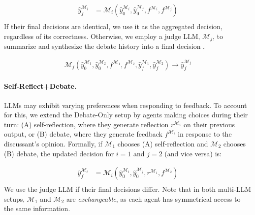 \begin{equation}
\begin{split}
    \hat{y}_f^{\mathcal{M}_i} &= \mathcal{M}_i(\hat{y}_0^{\mathcal{M}_i}, \hat{y}_0^{\mathcal{M}_j}, f^{\mathcal{M}_i}, f^{\mathcal{M}_j}) \\
\end{split}
\end{equation}
If their final decisions are identical, we use it as the aggregated decision, regardless of its correctness. Otherwise, we employ a judge LLM, $\mathcal{M}_j$, to summarize and synthesize the debate history into a final decision \cite{feng-etal-2024-dont, li-etal-2024-llms-speak}.



\begin{equation}
\begin{split}
    \mathcal{M}_j(\hat{y}_0^{\mathcal{M}_1}, \hat{y}_0^{\mathcal{M}_2}, f^{\mathcal{M}_1}, f^{\mathcal{M}_2},
    \hat{y}_f^{\mathcal{M}_1}, \hat{y}_f^{\mathcal{M}_2}) \rightarrow \hat{y}_f^{\mathcal{M}_j}
\end{split}
\end{equation}

\paragraph{Self-Reflect+Debate.}
LLMs may exhibit varying preferences when responding to feedback. To account for this, we extend the Debate-Only setup by agents making choices during their turn: (A) self-reflection, where they generate reflection $r^{\mathcal{M}_i}$ on their previous output, or (B) debate, where they generate feedback $f^{\mathcal{M}_i}$ in response to the discussant's opinion. Formally, if $\mathcal{M}_1$ chooses (A) self-reflection and $\mathcal{M}_2$ chooses (B) debate, the updated decision for $i=1$ and $j=2$ (and vice versa) is:

\begin{equation}
\begin{split}
    \hat{y}_f^{\mathcal{M}_i} &= \mathcal{M}_i(\hat{y}_0^{\mathcal{M}_i}, \hat{y}_0^{\mathcal{M}_j}, r^{\mathcal{M}_1}, f^{\mathcal{M}_2}) \\
\end{split}
\end{equation}
We use the judge LLM if their final decisions differ. Note that in both multi-LLM setups, $\mathcal{M}_1$ and $\mathcal{M}_2$ are \textit{exchangeable}, as each agent has symmetrical access to the same information.


